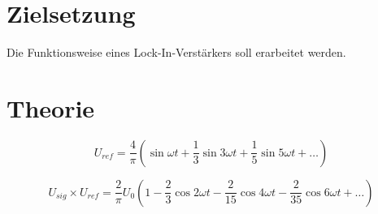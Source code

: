\section{Zielsetzung}
\label{sec:Zielsetzung}
Die Funktionsweise eines Lock-In-Verstärkers soll erarbeitet werden.
\section{Theorie}
\label{sec:Theorie}

\begin{equation}\label{eqn:referenzFrequenz}
    U_{ref} = \frac{4}{\pi}\left(\sin{ωt} + \frac{1}{3}\sin{3ωt} + \frac{1}{5}\sin{5ωt} + \ldots\right)
\end{equation}

\begin{equation}\label{eqn:produkt}
    U_{sig} \times U_{ref} = \frac{2}{π}U_0\left( 1 - \frac{2}{3}\cos{2ωt} - \frac{2}{15}\cos{4ωt} - \frac{2}{35}\cos{6ωt} + \ldots\right)
\end{equation}